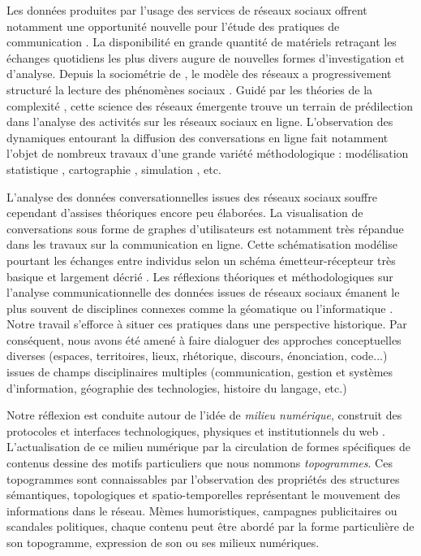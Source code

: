 Les données produites par l'usage des services de réseaux sociaux offrent notamment une opportunité nouvelle pour l'étude des pratiques de communication \citep{Zook2007,Nettleton2013,Manovich2011}. La disponibilité en grande quantité de matériels retraçant les échanges quotidiens les plus divers augure de nouvelles formes d'investigation et d'analyse. Depuis la sociométrie de \cite{Moreno1938}, le modèle des réseaux a progressivement structuré la lecture des phénomènes sociaux \citep{Latour1999a, Castells1989}. Guidé par les théories de la complexité \citep{Morin1990}, cette science des réseaux émergente \citep{Brandes2013} trouve un terrain de prédilection dans l'analyse des activités sur les réseaux sociaux en ligne. L'observation des dynamiques entourant la diffusion des conversations en ligne fait notamment l'objet de nombreux travaux d'une grande variété méthodologique : modélisation statistique \citep{Steyer2006}, cartographie \citep{Conover2013,Eisenstein2012},  simulation \citep{Tubaro2010}, etc. 

L'analyse des données conversationnelles issues des réseaux sociaux souffre cependant d'assises théoriques encore peu élaborées. La visualisation de conversations sous forme de graphes d'utilisateurs est notamment très répandue dans les travaux sur la communication en ligne. Cette schématisation modélise pourtant les échanges entre individus selon un schéma émetteur-récepteur très basique et largement décrié \citep{Proulx2000}. Les réflexions théoriques et méthodologiques sur l'analyse communicationnelle des données issues de réseaux sociaux émanent le plus souvent de disciplines connexes comme la géomatique \citep{Crampton2013, Leetaru2013} ou l'informatique \citep{Brodka2013, Russel2011}. Notre travail s'efforce à situer ces pratiques dans une perspective historique. Par conséquent, nous avons été amené à faire dialoguer des approches conceptuelles diverses (espaces, territoires, lieux, rhétorique, discours, énonciation, code...) issues de champs disciplinaires multiples (communication, gestion et systèmes d'information, géographie des technologies, histoire du langage, etc.)

Notre réflexion est conduite autour de l'idée de \textit{milieu numérique}, construit des protocoles et interfaces technologiques, physiques et institutionnels du web \cite{Hui2012}. L'actualisation de ce milieu numérique par la circulation de formes spécifiques de contenus dessine des motifs particuliers que nous nommons \textit{topogrammes}. Ces topogrammes sont connaissables par l'observation des propriétés des structures sémantiques, topologiques et spatio-temporelles représentant le mouvement des informations dans le réseau. Mèmes humoristiques, campagnes publicitaires ou scandales politiques, chaque contenu peut être abordé par la forme particulière de son topogramme, expression de son ou ses milieux numériques.



